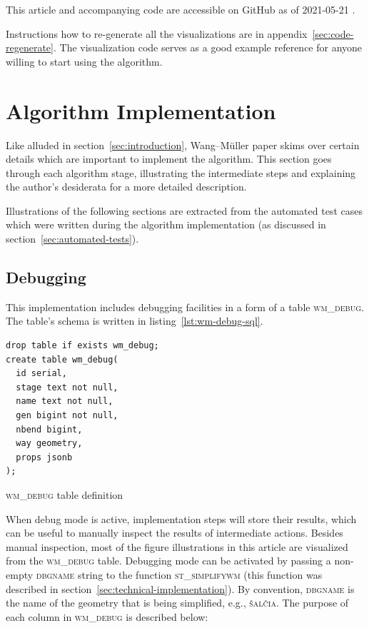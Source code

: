 \documentclass[a4paper]{article}
\newcommand{\WM}{Wang--M{\"u}ller}
\begin{document}
This article and accompanying code are accessible on GitHub as of 2021-05-21
\cite{wmsql}.

Instructions how to re-generate all the visualizations are in
appendix~\ref{sec:code-regenerate}. The visualization code serves as a good
example reference for anyone willing to start using the algorithm.

\section{Algorithm Implementation}

Like alluded in section~\ref{sec:introduction}, {\WM} paper skims over
certain details which are important to implement the algorithm. This section
goes through each algorithm stage, illustrating the intermediate steps and
explaining the author's desiderata for a more detailed description.

Illustrations of the following sections are extracted from the automated test
cases which were written during the algorithm implementation (as discussed in
section~\ref{sec:automated-tests}).

\subsection{Debugging}
\label{sec:debugging}

This implementation includes debugging facilities in a form of a table
\textsc{wm\_debug}. The table's schema is written in
listing~\ref{lst:wm-debug-sql}.

\begin{listing}[h]
    \begin{verbatim}
drop table if exists wm_debug;
create table wm_debug(
  id serial,
  stage text not null,
  name text not null,
  gen bigint not null,
  nbend bigint,
  way geometry,
  props jsonb
);
    \end{verbatim}
    \caption{\textsc{wm\_debug} table definition}
    \label{lst:wm-debug-sql}
\end{listing}

When debug mode is active, implementation steps will store their results, which
can be useful to manually inspect the results of intermediate actions. Besides
manual inspection, most of the figure illustrations in this article are
visualized from the \textsc{wm\_debug} table. Debugging mode can be activated
by passing a non-empty \textsc{dbgname} string to the function
\textsc{st\_simplifywm} (this function was described in
section~\ref{sec:technical-implementation}). By convention, \textsc{dbgname} is
the name of the geometry that is being simplified, e.g., \textsc{šalčia}. The
purpose of each column in \textsc{wm\_debug} is described below:
\end{document}
